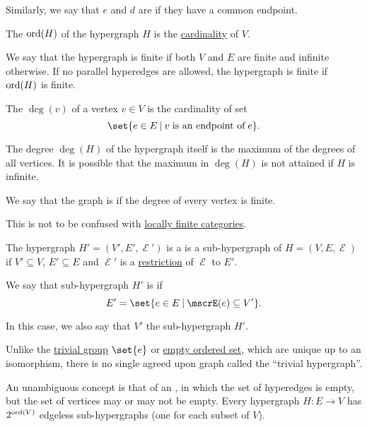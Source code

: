 \begin{definition}
\begin{thmenum}
    Similarly, we say that \( e \) and \( d \) are  if they have a common endpoint.

     The  \( \operatorname{ord}(H) \) of the hypergraph \( H \) is the \hyperref[thm:cardinality_existence]{cardinality} of \( V \).

    We say that the hypergraph is finite if both \( V \) and \( E \) are finite and infinite otherwise. If no parallel hyperedges are allowed, the hypergraph is finite if \( \operatorname{ord}(H) \) is finite.

     The  \( \deg(v) \) of a vertex \( v \in V \) is the cardinality of set
    \begin{equation*}
      \set{ e \in E \given v \T{is an endpoint of} e }.
    \end{equation*}

    The degree \( \deg(H) \) of the hypergraph itself is the maximum of the degrees of all vertices. It is possible that the maximum in \( \deg(H) \) is not attained if \( H \) is infinite.

    We say that the graph is  if the degree of every vertex is finite.

    This is not to be confused with \hyperref[def:category_size]{locally finite categories}.

     The hypergraph \( H' = (V', E', \mscrE') \) is a is a sub-hypergraph of \( H = (V, E, \mscrE) \) if \( V' \subseteq V \), \( E' \subseteq E \) and \( \mscrE' \) is a \hyperref[def:multi_valued_function/restriction]{restriction} of \( \mscrE \) to \( E' \).

    We say that sub-hypergraph \( H' \) is  if
    \begin{equation}\label{eq:def:hypergraph/submodel/full}
      E' = \set{ e \in E \given \mscrE(e) \subseteq V' }.
    \end{equation}

    In this case, we also say that \( V' \)  the sub-hypergraph \( H' \).

     Unlike the \hyperref[def:group/trivial]{trivial group} \( \set{ e } \) or \hyperref[def:partially_ordered_set/trivial]{empty ordered set}, which are unique up to an isomorphism, there is no single agreed upon graph called the \enquote{trivial hypergraph}.

    An unambiguous concept is that of an , in which the set of hyperedges is empty, but the set of vertices may or may not be empty. Every hypergraph \( H: E \to V \) has \( 2^{\operatorname{ord}(V)} \) edgeless sub-hypergraphs (one for each subset of \( V \)).


\end{thmenum}
\end{definition}
